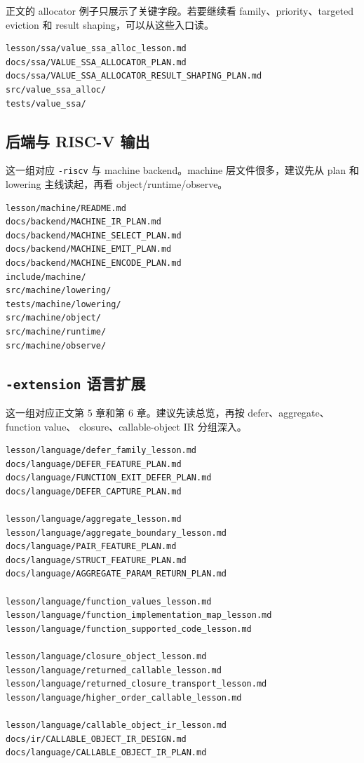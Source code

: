 \documentclass[UTF8,a4paper,11pt]{ctexart}
\begin{document}
正文的 allocator 例子只展示了关键字段。若要继续看 family、priority、targeted eviction
和 result shaping，可以从这些入口读。

\begin{lstlisting}[language={}]
lesson/ssa/value_ssa_alloc_lesson.md
docs/ssa/VALUE_SSA_ALLOCATOR_PLAN.md
docs/ssa/VALUE_SSA_ALLOCATOR_RESULT_SHAPING_PLAN.md
src/value_ssa_alloc/
tests/value_ssa/
\end{lstlisting}

\subsection{后端与 RISC-V 输出}

这一组对应 \texttt{-riscv} 与 machine backend。machine 层文件很多，建议先从 plan 和
lowering 主线读起，再看 object/runtime/observe。

\begin{lstlisting}[language={}]
lesson/machine/README.md
docs/backend/MACHINE_IR_PLAN.md
docs/backend/MACHINE_SELECT_PLAN.md
docs/backend/MACHINE_EMIT_PLAN.md
docs/backend/MACHINE_ENCODE_PLAN.md
include/machine/
src/machine/lowering/
tests/machine/lowering/
src/machine/object/
src/machine/runtime/
src/machine/observe/
\end{lstlisting}

\subsection{\texttt{-extension} 语言扩展}

这一组对应正文第 5 章和第 6 章。建议先读总览，再按 defer、aggregate、function value、
closure、callable-object IR 分组深入。

\begin{lstlisting}[language={}]
lesson/language/defer_family_lesson.md
docs/language/DEFER_FEATURE_PLAN.md
docs/language/FUNCTION_EXIT_DEFER_PLAN.md
docs/language/DEFER_CAPTURE_PLAN.md

lesson/language/aggregate_lesson.md
lesson/language/aggregate_boundary_lesson.md
docs/language/PAIR_FEATURE_PLAN.md
docs/language/STRUCT_FEATURE_PLAN.md
docs/language/AGGREGATE_PARAM_RETURN_PLAN.md

lesson/language/function_values_lesson.md
lesson/language/function_implementation_map_lesson.md
lesson/language/function_supported_code_lesson.md

lesson/language/closure_object_lesson.md
lesson/language/returned_callable_lesson.md
lesson/language/returned_closure_transport_lesson.md
lesson/language/higher_order_callable_lesson.md

lesson/language/callable_object_ir_lesson.md
docs/ir/CALLABLE_OBJECT_IR_DESIGN.md
docs/language/CALLABLE_OBJECT_IR_PLAN.md
\end{lstlisting}
\end{document}
